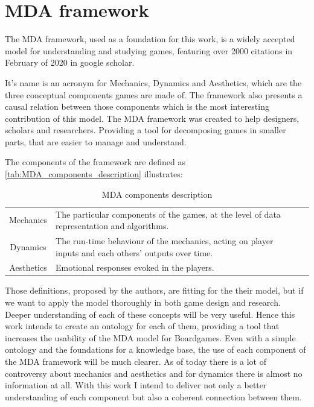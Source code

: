 \section{MDA framework}

The MDA framework, used as a foundation for this work, is a widely accepted model for understanding and studying games, featuring over 2000 citations in February of 2020 in google scholar. 

It's name is an acronym for Mechanics, Dynamics and Aesthetics, which are the three conceptual components games are made of. The framework also presents a causal relation between those components which is the most interesting contribution of this model. The MDA framework was created to help designers, scholars and researchers. Providing a tool for decomposing games in smaller parts, that are easier to manage and understand. 

The components of the framework are defined as \autoref{tab:MDA_components_description} illustrates:
{\renewcommand{\arraystretch}{1.5}
\begin{table}[!h]
    \caption{MDA components description \citep{Hunicke2004}}
    \vspace{.5em}
    \centering
    \begin{tabular}{c|m{6cm}l|}
    Mechanics &  The particular components of the games, at the level of data representation and algorithms.\\ \cline{1-2}
    Dynamics & The run-time behaviour of the mechanics, acting on player inputs and each others' outputs over time.\\ \cline{1-2} 
    Aesthetics & Emotional responses evoked in the players.\\
    \end{tabular}
    \label{tab:MDA_components_description}
\end{table}}


Those definitions, proposed by the authors, are fitting for the their model, but if we want to apply the model thoroughly in both game design and research. Deeper understanding of each of these concepts will be very useful. Hence this work intends to create an ontology for each of them, providing a tool that increases the usability of the MDA model for Boardgames. Even with a simple ontology and the foundations for a knowledge base, the use of each component of the MDA framework will be much clearer. As of today there is a lot of controversy about mechanics and aesthetics and for dynamics there is almost no information at all. With this work I intend to deliver not only a better  understanding of each component but also a coherent connection between them. 

